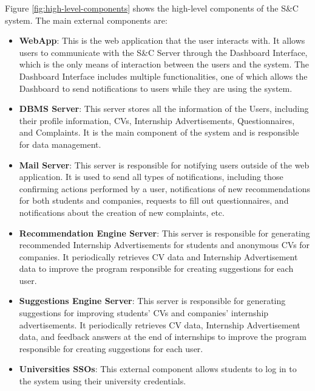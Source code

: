 \par Figure \ref{fig:high-level-components} shows the high-level components of the S\&C system. The main external components are:

\begin{itemize}
      \item \textbf{WebApp}: This is the web application that the user interacts with. It allows users to communicate
            with the S\&C Server through the Dashboard Interface, which is the only means of interaction
            between the users and the system. The Dashboard Interface includes multiple functionalities,
            one of which allows the Dashboard to send notifications to users while they are using the system.
      \item \textbf{DBMS Server}: This server stores all the information of the Users, including their profile information, CVs,
            Internship Advertisements, Questionnaires, and Complaints. It is the main component of the system and is
            responsible for data management.
      \item \textbf{Mail Server}: This server is responsible for notifying users outside of the web application.
            It is used to send all types of notifications, including those confirming actions performed by a user,
            notifications of new recommendations for both students and companies, requests to fill out questionnaires,
            and notifications about the creation of new complaints, etc.
      \item \textbf{Recommendation Engine Server}: This server is responsible for generating recommended Internship Advertisements for students
            and anonymous CVs for companies. It periodically retrieves CV data and Internship Advertisement data
            to improve the program responsible for creating suggestions for each user.
      \item \textbf{Suggestions Engine Server}: This server is responsible for generating suggestions for improving students' CVs and companies' internship advertisements.
            It periodically retrieves CV data, Internship Advertisement data, and feedback answers at the end of internships
            to improve the program responsible for creating suggestions for each user.
      \item \textbf{Universities SSOs}: This external component allows students to log in to the system using their university credentials.
\end{itemize}

